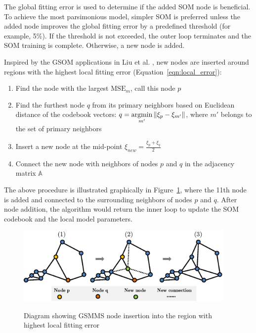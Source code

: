 \documentclass[review,3p]{elsarticle}
\renewcommand\[{\begin{equation}}
\renewcommand\]{\end{equation}}
\begin{document}
The global fitting error is used to determine if the added SOM node is beneficial. To achieve the most parsimonious model, simpler SOM is preferred unless the added node improves the global fitting error by a predefined threshold (for example, 5\%). 
If the threshold is not exceeded, the outer loop terminates and the SOM training is complete. Otherwise, a new node is added.

Inspired by the GSOM applications in Liu et al. \cite{Liu2009a}, new nodes are inserted around regions with the highest local fitting error (Equation~\ref{eqn:local_error}):
\begin{enumerate}
\item Find the node with the largest $\mathrm{MSE}_m$, call this node $p$
\item Find the furthest node $q$ from its primary neighbors based on
    Euclidean distance of the codebook vectors: $q =
    \mathop{{\rm{argmin}}}\limits_{m'} \left\| {{\xi _p} - {\xi _{m'}}}
    \right\|$, where $m'$ belongs to the set of primary neighbors
\item Insert a new node at the mid-point $\xi_{new} = \frac{\xi_{p} +
    \xi_{q} }{2}$
\item  Connect the new node with neighbors of nodes $p$ and $q$ in the
    adjacency matrix $\mathbb A$
\end{enumerate}
The above procedure is illustrated graphically in
Figure~\ref{fig:gsmms_adding_nodes}, where the 11th node is added and
connected to the surrounding neighbors of nodes $p$ and $q$. After node
addition, the algorithm would return the inner loop to update the SOM
codebook and the local model parameters.

\begin{figure}[!htpb]
  \centering
  \includegraphics[width=0.95\textwidth]{figures/gsmms/gsmms_adding_nodes.eps}\\
  \caption{Diagram showing GSMMS node insertion into the region with highest local fitting error}\label{fig:gsmms_adding_nodes}
\end{figure}
\end{document}
